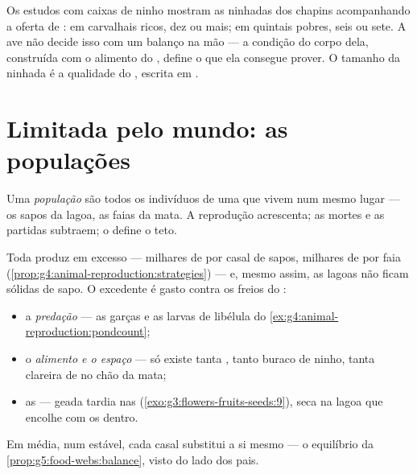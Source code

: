 \begin{example}\label{ex:g8:reproduction-and-environment:clutch}
Os estudos com caixas de ninho mostram as ninhadas dos chapins
acompanhando a oferta de : em carvalhais ricos, dez  ou
mais; em quintais pobres, seis ou sete. A ave não decide isso com um
balanço na mão --- a condição do corpo dela, construída com o alimento
do , define o que ela consegue prover. O tamanho da ninhada é a
qualidade do , escrita em .
\end{example}

\section{Limitada pelo mundo: as populações}

\begin{definition}[População]\label{def:g8:reproduction-and-environment:population}
Uma \emph{população} são todos os indivíduos de uma
 que vivem num mesmo lugar --- os sapos da lagoa, as faias da
mata. A reprodução acrescenta; as mortes e as partidas subtraem; o
 define o teto.
\end{definition}

\begin{proposition}\label{prop:g8:reproduction-and-environment:limits}
Toda  produz em excesso --- milhares de  por casal de
sapos, milhares de  por faia
(\cref{prop:g4:animal-reproduction:strategies}) --- e, mesmo assim, as
lagoas não ficam sólidas de sapo. O excedente é gasto contra os freios
do :
\begin{itemize}
  \item a \emph{predação} --- as garças e as larvas de libélula do
        \cref{ex:g4:animal-reproduction:pondcount};
  \item o \emph{alimento e o espaço} --- só existe tanta ,
        tanto buraco de ninho, tanta clareira de  no chão da mata;
  \item as \emph{} --- geada tardia nas 
        (\cref{exo:g3:flowers-fruits-seeds:9}), seca na lagoa que
        encolhe com os  dentro.
\end{itemize}
Em média, num  estável, cada casal substitui a si mesmo --- o
equilíbrio da \cref{prop:g5:food-webs:balance}, visto do lado dos
pais.
\end{proposition}
\admitted

